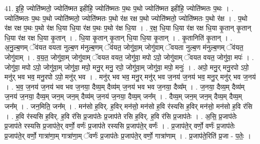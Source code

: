 \documentclass[17pt]{extarticle}
\begin{document}
41. इ॒हि॒ ज्योति॑ष्मतो॒ ज्योति॑ष्मत इहीहि॒ ज्योति॑ष्मतः प॒थः प॒थो ज्योति॑ष्मत इहीहि॒ ज्योति॑ष्मतः प॒थः । . ज्योति॑ष्मतः प॒थः प॒थो ज्योति॑ष्मतो॒ ज्योति॑ष्मतः प॒थो र॑क्ष रक्ष प॒थो ज्योति॑ष्मतो॒ ज्योति॑ष्मतः प॒थो र॑क्ष । . प॒थो र॑क्ष रक्ष प॒थः प॒थो र॑क्ष धि॒या धि॒या र॑क्ष प॒थः प॒थो र॑क्ष धि॒या । . र॒क्ष॒ धि॒या धि॒या र॑क्ष रक्ष धि॒या कृ॒तान् कृ॒तान् धि॒या र॑क्ष रक्ष धि॒या कृ॒तान् । . धि॒या कृ॒तान् कृ॒तान् धि॒या धि॒या कृ॒तान् । . कृ॒तानिति॑ कृ॒तान् । . अ॒नु॒ल्ब॒णम् ॅव॑यत वयता नुल्ब॒ण म॑नुल्ब॒णम् ॅव॑यत॒ जोगु॑वा॒म् जोगु॑वाम् ॅवयता नुल्ब॒ण म॑नुल्ब॒णम् ॅव॑यत॒ जोगु॑वाम् । . व॒य॒त॒ जोगु॑वा॒म् जोगु॑वाम् ॅवयत वयत॒ जोगु॑वा॒ मपो ऽपो॒ जोगु॑वाम् ॅवयत वयत॒ जोगु॑वा॒ मपः॑ । . जोगु॑वा॒ मपो ऽपो॒ जोगु॑वा॒म् जोगु॑वा॒ मपो॒ मनु॒र् मनु॒ रपो॒ जोगु॑वा॒म् जोगु॑वा॒ मपो॒ मनुः॑ । . अपो॒ मनु॒र् मनु॒रपो ऽपो॒ मनु॑र् भव भव॒ मनु॒रपो ऽपो॒ मनु॑र् भव । . मनु॑र् भव भव॒ मनु॒र् मनु॑र् भव ज॒नय॑ ज॒नय॑ भव॒ मनु॒र् मनु॑र् भव ज॒नय॑ । . भ॒व॒ ज॒नय॑ ज॒नय॑ भव भव ज॒नया॒ दैव्य॒म् दैव्य॑म् ज॒नय॑ भव भव ज॒नया॒ दैव्य᳚म् । . ज॒नया॒ दैव्य॒म् दैव्य॑म् ज॒नय॑ ज॒नया॒ दैव्य॒म् जन॒म् जन॒म् दैव्य॑म् ज॒नय॑ ज॒नया॒ दैव्य॒म् जन᳚म् । . दैव्य॒म् जन॒म् जन॒म् दैव्य॒म् दैव्य॒म् जन᳚म् । . जन॒मिति॒ जन᳚म् । . मन॑सो ह॒विर्. ह॒विर् मन॑सो॒ मन॑सो ह॒वि र॑स्यसि ह॒विर् मन॑सो॒ मन॑सो ह॒वि र॑सि । . ह॒वि र॑स्यसि ह॒विर्. ह॒वि र॑सि प्र॒जाप॑तेः प्र॒जाप॑ते रसि ह॒विर्. ह॒वि र॑सि प्र॒जाप॑तेः । . अ॒सि॒ प्र॒जाप॑तेः प्र॒जाप॑ते रस्यसि प्र॒जाप॑ते॒र् वर्णो॒ वर्णः॑ प्र॒जाप॑ते रस्यसि प्र॒जाप॑ते॒र् वर्णः॑ । . प्र॒जाप॑ते॒र् वर्णो॒ वर्णः॑ प्र॒जाप॑तेः प्र॒जाप॑ते॒र् वर्णो॒ गात्रा॑णा॒म् गात्रा॑णा॒म् ॅवर्णः॑ प्र॒जाप॑तेः प्र॒जाप॑ते॒र् वर्णो॒ गात्रा॑णाम् । . प्र॒जाप॑ते॒रिति॑ प्र॒जा - प॒तेः॒ । \newline
\end{document}
